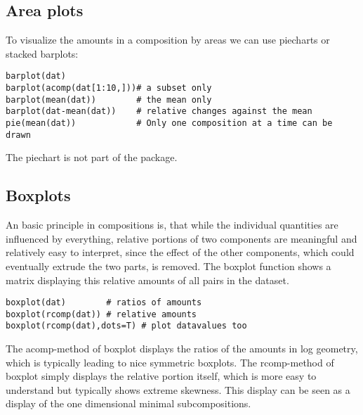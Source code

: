 \documentclass{article}
\begin{document}
\subsection{Area plots}
To visualize the amounts in a composition by areas we can use piecharts or
stacked barplots:
\begin{verbatim}
barplot(dat)              
barplot(acomp(dat[1:10,]))# a subset only 
barplot(mean(dat))        # the mean only 
barplot(dat-mean(dat))    # relative changes against the mean
pie(mean(dat))            # Only one composition at a time can be drawn
\end{verbatim}
The piechart is not part of the package.

\subsection{Boxplots}
An basic principle in compositions is, that while the individual quantities
are influenced by everything, relative portions of two components are
meaningful and relatively easy to interpret, since the effect of the other
components, which could eventually extrude the two parts, is removed. The
boxplot function shows a matrix displaying this relative amounts of all pairs
in the dataset. 
\begin{verbatim}
boxplot(dat)        # ratios of amounts
boxplot(rcomp(dat)) # relative amounts
boxplot(rcomp(dat),dots=T) # plot datavalues too
\end{verbatim}
The acomp-method of boxplot displays the ratios of the amounts in log
geometry, which is typically leading to nice symmetric boxplots. The
rcomp-method of boxplot simply displays the relative portion itself, which is
more easy to understand but typically shows extreme skewness. This display can
be seen as a display of the one dimensional minimal subcompositions. 
\end{document}
